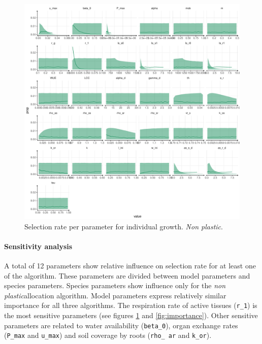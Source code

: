 \begin{figure}[p]\label{fig:accept_rate}
\includegraphics[width = \textwidth]{./2_PP/Figures/Calibration/acceptance_rate_RSRnWeight_per_par_none.pdf}
\caption{Selection rate per parameter for individual growth. \textit{Non plastic}.}
\end{figure}



\paragraph{Sensitivity analysis}


A total of 12 parameters show relative influence on selection rate for at least one of the algorithm. These parameters are divided between model parameters and species parameters. Species parameters show influence only for the \textit{non plastic}allocation algorithm. Model parameters express relatively similar importance for all three algorithms. The respiration rate of active tissues (\texttt{r\_1}) is the most sensitive parameters (see figures \ref{fig:accept_rate} and \ref{fig:importance}). Other sensitive parameters are related to water availability (\texttt{beta\_0}), organ exchange rates (\texttt{P\_max} and \texttt{u\_max}) and soil coverage by roots (\texttt{rho\_ ar} and \texttt{k\_or}).

